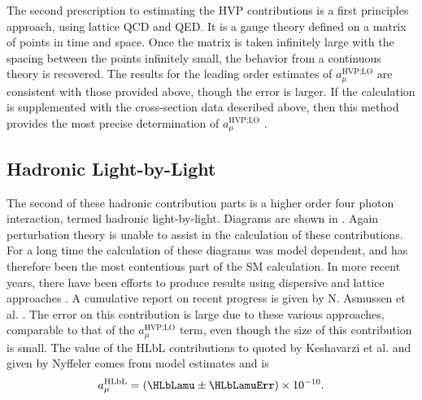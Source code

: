 The second prescription to estimating the HVP contributions is a first principles approach, using lattice QCD and QED. It is a gauge theory defined on a matrix of points in time and space. Once the matrix is taken infinitely large with the spacing between the points infinitely small, the behavior from a continuous theory is recovered. The results for the leading order estimates of $a_{\mu}^{\text{HVP;LO}}$ are consistent with those provided above, though the error is larger. If the calculation is supplemented with the cross-section data described above, then this method provides the most precise determination of $a_{\mu}^{\text{HVP;LO}}$ \cite{Lattice}.



\subsection*{Hadronic Light-by-Light}
\label{subsec:HLbL}

The second of these hadronic contribution parts is a higher order four photon interaction, termed hadronic light-by-light. Diagrams are shown in . Again perturbation theory is unable to assist in the calculation of these contributions. For a long time the calculation of these diagrams was model dependent, and has therefore been the most contentious part of the SM calculation. In more recent years, there have been efforts to produce results using dispersive \cite{Colangelo:2014dfa,Colangelo:2015ama,Colangelo:2017qdm} and lattice approaches \cite{Blum:2015gfa,Blum:2016lnc,Blum:2017cer}. A cumulative report on recent progress is given by N. Asmussen et al. \cite{HLbL1}. The error on this contribution is large due to these various approaches, comparable to that of the $a_{\mu}^{\text{HVP;LO}}$ term, even though the size of this contribution is small. The value of the HLbL contributions to \amu quoted by Keshavarzi et al. and given by Nyffeler \cite{Keshavarzi:2018mgv,Nyffeler:2016gnb} comes from model estimates and is 
		\begin{align}
            a_{\mu}^{\text{HLbL}} = (\HLbLamu \pm \HLbLamuErr) \times 10^{-10}.
		\end{align}


